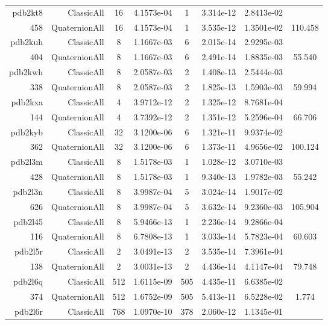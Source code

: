 \begin{xltabular}{\textwidth}{r|rcS[table-format=1.4e+2]cS[table-format=1.3e+2]S[table-format=1.4e+2]S[table-format=-1.3]}
pdb2kt8 & ClassicAll & 16 & 4.1573e-04 & 1 & 3.314e-12 & 2.8413e-02 & \\
458 & QuaternionAll & 16 & 4.1573e-04 & 1 & 3.535e-12 & 1.3501e-02 & 110.458\\  \addlinespace
pdb2kuh & ClassicAll & 8 & 1.1667e-03 & 6 & 2.015e-14 & 2.9295e-03 & \\
404 & QuaternionAll & 8 & 1.1667e-03 & 6 & 2.491e-14 & 1.8835e-03 & 55.540\\  \addlinespace
pdb2kwh & ClassicAll & 8 & 2.0587e-03 & 2 & 1.408e-13 & 2.5444e-03 & \\
338 & QuaternionAll & 8 & 2.0587e-03 & 2 & 1.825e-13 & 1.5903e-03 & 59.994\\  \addlinespace
pdb2kxa & ClassicAll & 4 & 3.9712e-12 & 2 & 1.325e-12 & 8.7681e-04 & \\
144 & QuaternionAll & 4 & 3.7392e-12 & 2 & 1.351e-12 & 5.2596e-04 & 66.706\\  \addlinespace
pdb2kyb & ClassicAll & 32 & 3.1200e-06 & 6 & 1.321e-11 & 9.9374e-02 & \\
362 & QuaternionAll & 32 & 3.1200e-06 & 6 & 1.373e-11 & 4.9656e-02 & 100.124\\  \addlinespace
pdb2l3m & ClassicAll & 8 & 1.5178e-03 & 1 & 1.028e-12 & 3.0710e-03 & \\
428 & QuaternionAll & 8 & 1.5178e-03 & 1 & 9.340e-13 & 1.9782e-03 & 55.242\\  \addlinespace
pdb2l3n & ClassicAll & 8 & 3.9987e-04 & 5 & 3.024e-14 & 1.9017e-02 & \\
626 & QuaternionAll & 8 & 3.9987e-04 & 5 & 3.632e-14 & 9.2360e-03 & 105.904\\  \addlinespace
pdb2l45 & ClassicAll & 8 & 5.9466e-13 & 1 & 2.236e-14 & 9.2866e-04 & \\
116 & QuaternionAll & 8 & 6.7808e-13 & 1 & 3.033e-14 & 5.7823e-04 & 60.603\\  \addlinespace
pdb2l5r & ClassicAll & 2 & 3.0491e-13 & 2 & 3.535e-14 & 7.3961e-04 & \\
138 & QuaternionAll & 2 & 3.0031e-13 & 2 & 4.436e-14 & 4.1147e-04 & 79.748\\  \addlinespace
pdb2l6q & ClassicAll & 512 & 1.6115e-09 & 505 & 4.435e-11 & 6.6385e-02 & \\
374 & QuaternionAll & 512 & 1.6752e-09 & 505 & 5.413e-11 & 6.5228e-02 & 1.774\\  \addlinespace
pdb2l6r & ClassicAll & 768 & 1.0970e-10 & 378 & 2.060e-12 & 1.1345e-01 & \\

\end{xltabular}
